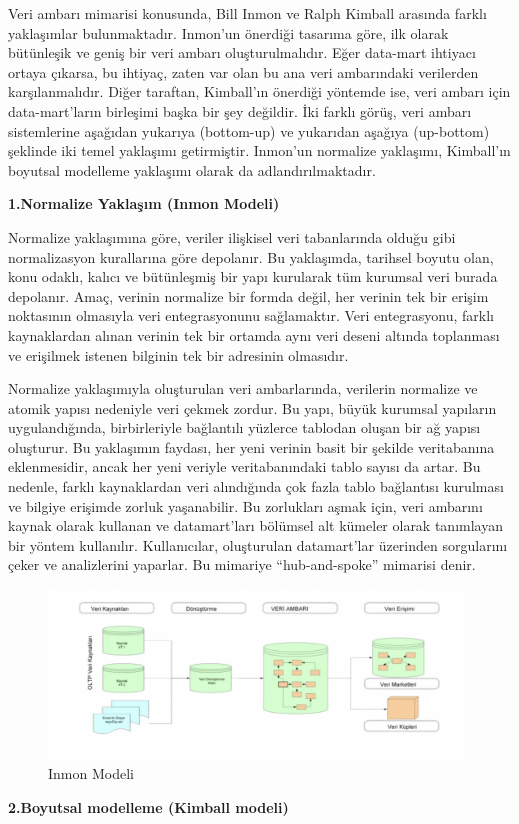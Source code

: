 \documentclass{article}
\begin{document}
 Veri ambarı mimarisi konusunda, Bill Inmon ve Ralph Kimball arasında farklı yaklaşımlar bulunmaktadır. Inmon’un önerdiği tasarıma göre, ilk olarak bütünleşik ve geniş bir veri ambarı oluşturulmalıdır. Eğer data-mart ihtiyacı ortaya çıkarsa, bu ihtiyaç, zaten var olan bu ana veri ambarındaki verilerden karşılanmalıdır. Diğer taraftan, Kimball’ın önerdiği yöntemde ise, veri ambarı için data-mart’ların birleşimi başka bir şey değildir. İki farklı görüş, veri ambarı sistemlerine aşağıdan yukarıya (bottom-up) ve yukarıdan aşağıya (up-bottom) şeklinde iki temel yaklaşımı getirmiştir. Inmon’un normalize yaklaşımı, Kimball’ın boyutsal modelleme yaklaşımı olarak da adlandırılmaktadır.

\vspace{10pt}
 \textbf{1.Normalize Yaklaşım (Inmon Modeli)}

 Normalize yaklaşımına göre, veriler ilişkisel veri tabanlarında olduğu gibi normalizasyon kurallarına göre depolanır. Bu yaklaşımda, tarihsel boyutu olan, konu odaklı, kalıcı ve bütünleşmiş bir yapı kurularak tüm kurumsal veri burada depolanır. Amaç, verinin normalize bir formda değil, her verinin tek bir erişim noktasının olmasıyla veri entegrasyonunu sağlamaktır. Veri entegrasyonu, farklı kaynaklardan alınan verinin tek bir ortamda aynı veri deseni altında toplanması ve erişilmek istenen bilginin tek bir adresinin olmasıdır.

 Normalize yaklaşımıyla oluşturulan veri ambarlarında, verilerin normalize ve atomik yapısı nedeniyle veri çekmek zordur. Bu yapı, büyük kurumsal yapıların uygulandığında, birbirleriyle bağlantılı yüzlerce tablodan oluşan bir ağ yapısı oluşturur. Bu yaklaşımın faydası, her yeni verinin basit bir şekilde veritabanına eklenmesidir, ancak her yeni veriyle veritabanındaki tablo sayısı da artar. Bu nedenle, farklı kaynaklardan veri alındığında çok fazla tablo bağlantısı kurulması ve bilgiye erişimde zorluk yaşanabilir. Bu zorlukları aşmak için, veri ambarını kaynak olarak kullanan ve datamart’ları bölümsel alt kümeler olarak tanımlayan bir yöntem kullanılır. Kullanıcılar, oluşturulan datamart’lar üzerinden sorgularını çeker ve analizlerini yaparlar. Bu mimariye “hub-and-spoke” mimarisi denir. 
 \begin{figure}[h]
\centering
  \includegraphics[width=11cm]{norm.png}
  \caption{Inmon Modeli\cite{ref5}}
\end{figure}
\newpage
\textbf{2.Boyutsal modelleme (Kimball modeli)}
\end{document}
